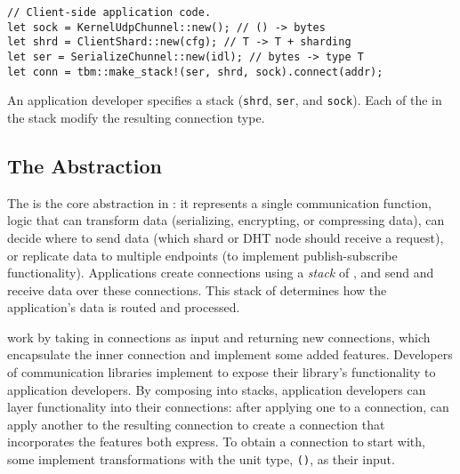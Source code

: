 \begin{listing}[t!]
\begin{verbatim}
// Client-side application code.
let sock = KernelUdpChunnel::new(); // () -> bytes
let shrd = ClientShard::new(cfg); // T -> T + sharding
let ser = SerializeChunnel::new(idl); // bytes -> type T
let conn = tbm::make_stack!(ser, shrd, sock).connect(addr);
\end{verbatim}
\caption{An application developer specifies a \tunnel stack (\texttt{shrd}, \texttt{ser}, and \texttt{sock}). Each of the \tunnels in the stack modify the resulting connection type. }
\label{l:chunnel-stack}
\end{listing}
\subsection{The \tunnel Abstraction}\label{s:chunnel}
The \tunnel is the core abstraction in \name: it represents a single communication function, \ie logic that can transform data (\eg serializing, encrypting, or compressing data), can decide where to send data (\eg which shard or DHT node should receive a request), or replicate data to multiple endpoints (\eg to implement publish-subscribe functionality). 
Applications create connections using a \emph{stack} of \tunnels, and send and receive data over these connections. This stack of \tunnels determines how the application's data is routed and processed. 

\tunnels work by taking in connections as input and returning new connections, which encapsulate the inner connection and implement some added features.
Developers of communication libraries implement \tunnels to expose their library's functionality to application developers.
By composing \tunnels into \tunnel stacks, application developers can layer functionality into their connections: after applying one \tunnel to a connection, \name can apply another \tunnel to the resulting connection to create a connection that incorporates the features both \tunnels express.
To obtain a connection to start with, some \tunnels implement transformations with the unit type, \texttt{()}, as their input.

